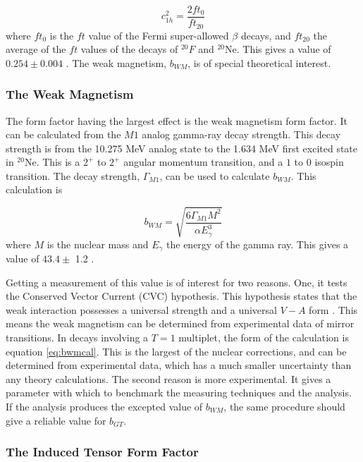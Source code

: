 \documentclass[../MaxHughesThesis.tex]{subfiles}
\begin{document}
\begin{equation}
	c_{1h}^{2} = \frac{2 ft_{0}}{ft_{20}}
	\label{eq:c1eq}
\end{equation}
where $ft_{0}$ is the $ft$ value of the Fermi super-allowed $\beta$ decays, and $ft_{20}$ the average of the $ft$ values of the decays of $^{20}F$ and $^{20}$Ne.
This gives a value of $0.254 \pm 0.004$ \cite{Min11}.
The weak magnetism, $b_{WM}$, is of special theoretical interest. 

\subsubsection{The Weak Magnetism}
The form factor having the largest effect is the weak magnetism form factor. 
It can be calculated from the $M1$ analog gamma-ray decay strength.
This decay strength is from the 10.275 MeV analog state to the 1.634 MeV first excited state in $^{20}$Ne.
This is a $2^{+}$ to $2^{+}$ angular momentum transition, and a $1$ to $0$ isospin transition.
The decay strength, $\Gamma_{M1}$, can be used to calculate $b_{WM}$.
This calculation is 

\begin{equation}
	b_{WM} = \sqrt{\frac{6\Gamma_{M1}M^{2}}{\alpha E_{\gamma}^{3}}}
	\label{eq:bwmcal}
\end{equation}
where $M$ is the nuclear mass and $E_{\gamma}$ the energy of the gamma ray.
This gives a value of $43.4 \pm$ 1.2 \cite{Min11}.

Getting a measurement of this value is of interest for two reasons.
One, it tests the Conserved Vector Current (CVC) hypothesis.
This hypothesis states that the weak interaction possesses a universal strength and a universal $V-A$ form \cite{Man58}.
This means the weak magnetism can be determined from experimental data of mirror transitions.
In decays involving a $T = 1$ multiplet, the form of the calculation is equation \ref{eq:bwmcal}. 
This is the largest of the nuclear corrections, and can be determined from experimental data, which has a much smaller uncertainty than any theory calculations.
The second reason is more experimental.
It gives a parameter with which to benchmark the measuring techniques and the analysis.
If the analysis produces the excepted value of $b_{WM}$, the same procedure should give a reliable value for $b_{GT}$.

\subsubsection{The Induced Tensor Form Factor}
\end{document}
